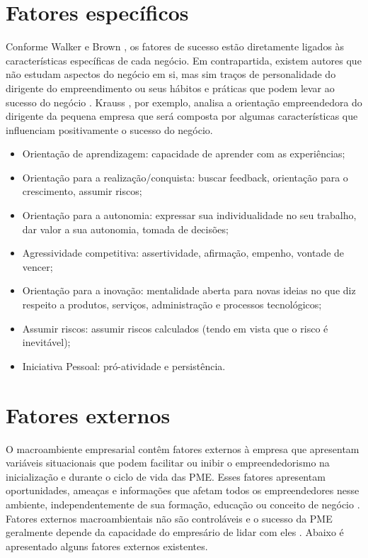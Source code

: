 \section{Fatores específicos}
\label{sec:temp}

Conforme Walker e Brown \cite{walkerebrown(2004)2004}, os fatores de sucesso estão diretamente ligados às características específicas de cada negócio. Em contrapartida, existem autores que não estudam aspectos do negócio em si, mas sim traços de personalidade do dirigente do empreendimento ou seus hábitos e práticas que podem levar ao sucesso do negócio \cite{criticalfactors2014}. Krauss \cite{krausss.i.etal2005}, por exemplo, analisa a orientação empreendedora do dirigente da pequena empresa que será composta por algumas características que influenciam positivamente o sucesso do negócio. 
\begin{itemize}
\item Orientação de aprendizagem: capacidade de aprender com as experiências;
\item Orientação para a realização/conquista: buscar feedback, orientação para o crescimento, assumir riscos;
\item Orientação para a autonomia: expressar sua individualidade no seu trabalho, dar valor a sua autonomia, tomada de decisões;
\item Agressividade competitiva: assertividade, afirmação, empenho, vontade de vencer;
\item Orientação para a inovação: mentalidade aberta para novas ideias no que diz respeito a produtos, serviços, administração e processos tecnológicos;
\item Assumir riscos: assumir riscos calculados (tendo em vista que o risco é inevitável);
\item Iniciativa Pessoal: pró-atividade e persistência.
\end{itemize}

\section{Fatores externos}
\label{sec:temp}

O macroambiente empresarial contêm fatores externos à empresa que apresentam variáveis situacionais que podem facilitar ou inibir o empreendedorismo na inicialização e durante o ciclo de vida das PME. Esses fatores apresentam oportunidades, ameaças e informações que afetam todos os empreendedores nesse ambiente, independentemente de sua formação, educação ou conceito de negócio \cite{Dahlqvist2000}. Fatores externos macroambientais não são controláveis e o sucesso da PME geralmente depende da capacidade do empresário de lidar com eles \cite{vivierss.vaneedens.&venter2001}. Abaixo é apresentado alguns fatores externos existentes.

